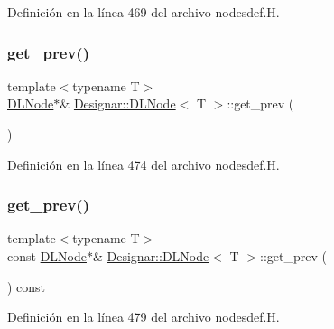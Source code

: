 Definición en la línea 469 del archivo nodesdef.\+H.

\mbox{\label{class_designar_1_1_d_l_node_a17271ebf6fc77a191c1a4a9c70fdb702}} 
\subsubsection{\texorpdfstring{get\+\_\+prev()}{get\_prev()}\hspace{0.1cm}{\footnotesize\ttfamily [1/2]}}
{\footnotesize\ttfamily template$<$typename T$>$ \\
\hyperlink{class_designar_1_1_d_l_node}{D\+L\+Node}$\ast$\& \hyperlink{class_designar_1_1_d_l_node}{Designar\+::\+D\+L\+Node}$<$ T $>$\+::get\+\_\+prev (\begin{DoxyParamCaption}{ }\end{DoxyParamCaption})\hspace{0.3cm}{\ttfamily [inline]}}



Definición en la línea 474 del archivo nodesdef.\+H.

\mbox{\label{class_designar_1_1_d_l_node_ad994f44ae1d1f56a318796d763361372}} 
\subsubsection{\texorpdfstring{get\+\_\+prev()}{get\_prev()}\hspace{0.1cm}{\footnotesize\ttfamily [2/2]}}
{\footnotesize\ttfamily template$<$typename T$>$ \\
const \hyperlink{class_designar_1_1_d_l_node}{D\+L\+Node}$\ast$\& \hyperlink{class_designar_1_1_d_l_node}{Designar\+::\+D\+L\+Node}$<$ T $>$\+::get\+\_\+prev (\begin{DoxyParamCaption}{ }\end{DoxyParamCaption}) const\hspace{0.3cm}{\ttfamily [inline]}}



Definición en la línea 479 del archivo nodesdef.\+H.

